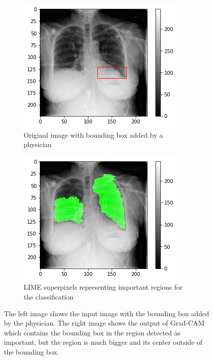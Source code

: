 \begin{figure}[H]
    \centering
    \begin{subfigure}[t]{.45\textwidth}
        \centering
        \includegraphics[width=\linewidth]{chapters/03_classification/images/rise1_bbox.png}
        \caption{Original image with bounding box added by a physician}
    \end{subfigure}\hspace{1cm}%
    \begin{subfigure}[t]{.45\textwidth}
        \centering
        \includegraphics[width=\linewidth]{chapters/03_classification/images/lime_2.png}
        \caption{LIME superpixels representing important regions for the classification}
    \end{subfigure}
    \caption{The left image shows the input image with the bounding box added by the physician. The right image shows the output of Grad-CAM which contains the bounding box in the region detected as important, but the region is much bigger and its center outside of the bounding box.}
\label{grad_cam_example_2}
\end{figure}


